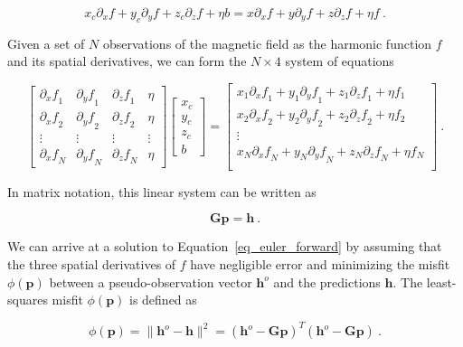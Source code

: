 \begin{equation}
x_c \partial_x f + y_c \partial_y f + z_c \partial_z f + \eta b
=
x \partial_x f + y \partial_y f + z \partial_z f + \eta f
\ .
\end{equation}

Given a set of $N$ observations of the magnetic field as the harmonic function $f$ and its spatial derivatives, we can form the $N \times 4$ system of equations

\begin{equation}
\begin{bmatrix}
  {\partial_x f}_1 & {\partial_y f}_1 & {\partial_z f}_1 & \eta \\
  {\partial_x f}_2 & {\partial_y f}_2 & {\partial_z f}_2 & \eta \\
  \vdots & \vdots & \vdots & \vdots \\
  {\partial_x f}_N & {\partial_y f}_N & {\partial_z f}_N & \eta
\end{bmatrix}
\begin{bmatrix}
  x_c \\ y_c \\ z_c \\ b
\end{bmatrix}
=
\begin{bmatrix}
  x_1 {\partial_x f}_1 + y_1 {\partial_y f}_1 + z_1 {\partial_z f}_1 + \eta f_1 \\
  x_2 {\partial_x f}_2 + y_2 {\partial_y f}_2 + z_2 {\partial_z f}_2 + \eta f_2 \\
  \vdots \\
  x_N {\partial_x f}_N + y_N {\partial_y f}_N + z_N {\partial_z f}_N + \eta f_N \\
\end{bmatrix}
\ .
\end{equation}

In matrix notation, this linear system can be written as

\begin{equation}
\label{eq_euler_forward}
\mathbf{G} \mathbf{p} = \mathbf{h} \ .
\end{equation}

We can arrive at a solution to Equation~\ref{eq_euler_forward} by assuming that the three spatial derivatives of $f$ have negligible error and minimizing the misfit $\phi(\mathbf{p})$ between a pseudo-observation vector $\mathbf{h}^o$ and the predictions $\mathbf{h}$. The least-squares misfit $\phi(\mathbf{p})$ is defined as

\begin{equation}
\label{ZTSuSBbL16}
\phi(\mathbf{p}) = \|\mathbf{h}^o - \mathbf{h}\|^2 = (\mathbf{h}^o - \mathbf{G}\mathbf{p})^T (\mathbf{h}^o - \mathbf{G}\mathbf{p})\ .
\end{equation}

